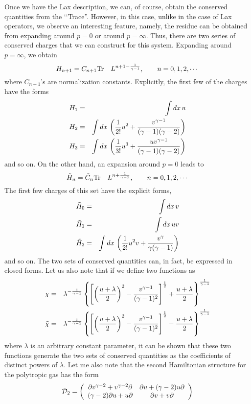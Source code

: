 \documentclass[a4paper,11pt]{article}
\begin{document}
Once we have the Lax description, we can, of course, obtain the
conserved quantities from the \lq\lq Trace''. However, in this case,
unlike in the case of Lax operators, we observe an interesting
feature, namely, the residue can be obtained from expanding around $p
= 0$ or around $p = \infty$. Thus, there are two series of conserved
charges that we can construct for this system. Expanding around
$p=\infty$, we obtain
\begin{equation}
H_{n+1} = C_{n+1} {\rm Tr}\quad L^{n+1 - {1\over \gamma -1}},\qquad
n=0,1,2,\cdots
\end{equation} 
where $C_{n+1}$'s are normalization constants. Explicitly, the first
few of the charges have the forms
\begin{eqnarray}
H_{1} & = & \int dx\,u\nonumber\\
H_{2} & = & \int dx\, \left({1\over 2!} u^{2} + {v^{\gamma -1}\over
(\gamma -1)(\gamma -2)}\right)\nonumber\\
H_{3} & = & \int dx\,\left({1\over 3!} u^{3} + {uv^{\gamma -1}\over
(\gamma -1)(\gamma -2)}\right)
\end{eqnarray}
and so on. On the other hand, an expansion around $p=0$ leads to
\begin{equation}
\tilde{H}_{n} = \tilde{C}_{n} {\rm Tr}\quad L^{n + {1\over \gamma
-1}},\qquad n = 0,1,2,\cdots
\end{equation}
The first few charges of this set have the explicit forms,
\begin{eqnarray}
\tilde{H}_{0} & = & \int dx\, v\nonumber\\
\tilde{H}_{1} & = & \int dx\, uv\nonumber\\
\tilde{H}_{2} & = & \int dx\,\left({1\over 2!} u^{2}v +
{v^{\gamma}\over \gamma (\gamma -1)}\right)
\end{eqnarray}
and so on. The two sets of conserved quantities can, in fact, be
expressed in closed forms. Let us also note that if we define two
functions as
\begin{eqnarray}
\chi & = & \lambda^{-{1\over \gamma -1}}
\left\{\left[\left({u+\lambda\over 2}\right)^{2} - {v^{\gamma -1}\over
(\gamma -1)^{2}}\right]^{1\over 2} + {u+\lambda\over
2}\right\}^{1\over \gamma -1}\nonumber\\
 \tilde{\chi} & = & \lambda^{-{1\over \gamma -1}}
\left\{\left[\left({u+\lambda\over 2}\right)^{2} - {v^{\gamma -1}\over
(\gamma -1)^{2}}\right]^{1\over 2} - {u+\lambda\over
2}\right\}^{1\over \gamma -1}
\end{eqnarray}
where $\lambda$ is an arbitrary constant parameter, it can be shown
that these two functions generate the two sets of conserved quantities
as the coefficients of distinct powers of $\lambda$. Let me also note
that the second Hamiltonian structure for the polytropic gas has the
form
\begin{equation}
{\cal D}_{2} = \left(\begin{array}{cc}
\partial v^{\gamma -2} + v^{\gamma -2} \partial & \partial u + (\gamma
-2) u \partial\\
(\gamma -2) \partial u + u \partial & \partial v + v \partial
\end{array}\right)
\end{equation}
\vfill\eject
\end{document}
